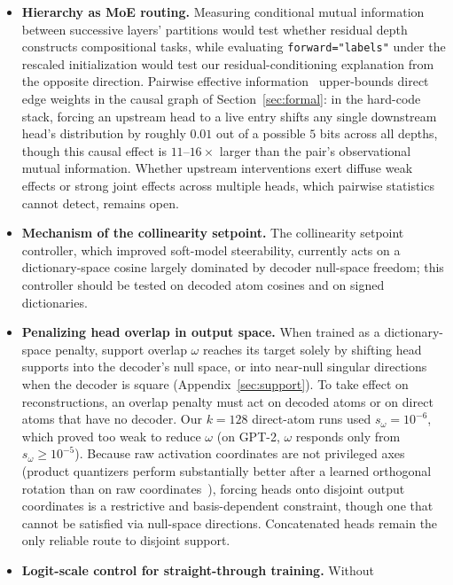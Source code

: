 \begin{itemize}
surface-form heads. Each protocol should be run identically on a stacked
categorical dictionary's heads and on the single-layer
\texttt{g160softmax} heads.
\item \textbf{Hierarchy as MoE routing.} Measuring conditional mutual
information between successive layers' partitions would test whether
residual depth constructs compositional tasks, while evaluating
\texttt{forward="labels"} under the rescaled initialization would test
our residual-conditioning explanation from the opposite direction.
Pairwise effective information~\cite{hoel2013} upper-bounds direct edge
weights in the causal graph of Section~\ref{sec:formal}: in the hard-code
stack, forcing an upstream head to a live entry shifts any single
downstream head's distribution by roughly $0.01$ out of a possible $5$
bits across all depths, though this causal effect is $11$--$16\times$
larger than the pair's observational mutual information. Whether upstream
interventions exert diffuse weak effects or strong joint effects across
multiple heads, which pairwise statistics cannot detect, remains open.
\item \textbf{Mechanism of the collinearity setpoint.} The collinearity
setpoint controller, which improved soft-model steerability, currently
acts on a dictionary-space cosine largely dominated by decoder null-space
freedom; this controller should be tested on decoded atom cosines and on
signed dictionaries.
\item \textbf{Penalizing head overlap in output space.} When trained as a
dictionary-space penalty, support overlap $\omega$ reaches its target
solely by shifting head supports into the decoder's null space, or into
near-null singular directions when the decoder is square
(Appendix~\ref{sec:support}). To take effect on reconstructions, an
overlap penalty must act on decoded atoms or on direct atoms that have no
decoder. Our $k{=}128$ direct-atom runs used $s_\omega{=}10^{-6}$, which
proved too weak to reduce $\omega$ (on GPT-2, $\omega$ responds only from
$s_\omega \ge 10^{-5}$). Because raw activation coordinates are not
privileged axes (product quantizers perform substantially better after a
learned orthogonal rotation than on raw coordinates~\cite{ge2014}),
forcing heads onto disjoint output coordinates is a restrictive and
basis-dependent constraint, though one that cannot be satisfied via
null-space directions. Concatenated heads remain the only reliable route
to disjoint support.
\item \textbf{Logit-scale control for straight-through training.} Without

\end{itemize}
